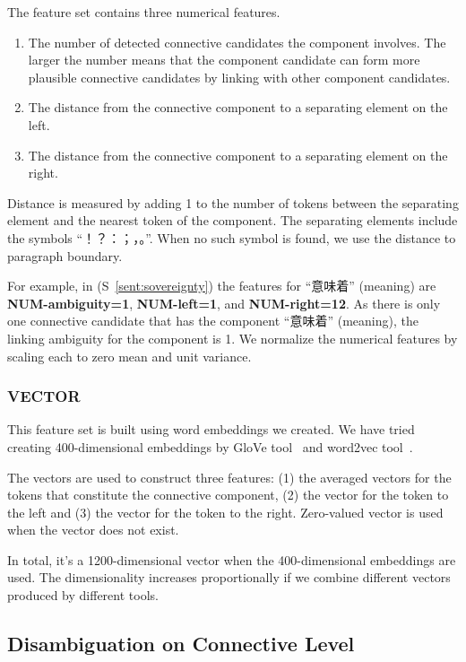 The feature set contains three numerical features.

\begin{enumerate}
    \item The number of detected connective candidates the component involves. The larger
        the number means that the component candidate can form more plausible connective
        candidates by linking with other component candidates.
    \item The distance from the connective component to a separating element on the left.
    \item The distance from the connective component to a
        separating element on the right.
\end{enumerate}

Distance is measured by adding 1 to the number of tokens
between the separating element and the nearest token of the component.
The separating elements include the symbols ``！？：；，。''.
When no such symbol is found, we use the distance to paragraph boundary.

For example, in (S~\ref{sent:sovereignty}) the features for “意味着” (meaning) are \textbf{NUM-ambiguity=1},
\textbf{NUM-left=1}, and \textbf{NUM-right=12}. As there is only one connective candidate that has the
component “意味着” (meaning), the linking ambiguity for the component is 1.
We normalize the numerical features by scaling each to zero mean and unit variance.


\subsubsection{VECTOR}

This feature set is built using word embeddings we created.
We have tried creating 400-dimensional embeddings by GloVe tool~\citep{pennington2014glove}
and word2vec tool~\citep{mikolov2013efficient,mikolov2013distributed}.

The vectors are used to construct three features: (1) the averaged vectors
for the tokens that constitute the connective component, (2) the vector for the
token to the left and (3) the vector for the token to the right. Zero-valued vector is used
when the vector does not exist.

In total, it's a 1200-dimensional vector when the 400-dimensional embeddings are used.
The dimensionality increases proportionally if we combine different vectors produced by
different tools.

\subsection{Disambiguation on Connective Level}
\label{c:discourse-disambig-connective}


